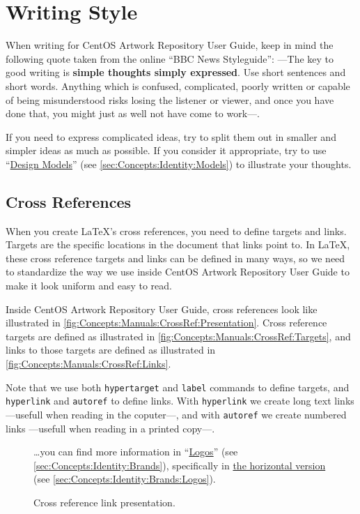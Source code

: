 \section{Writing Style}

When writing for CentOS Artwork Repository User Guide, keep in mind
the following quote taken from the online ``BBC News Styleguide'':
---The key to good writing is \textbf{simple thoughts simply
expressed}.  Use short sentences and short words.  Anything which is
confused, complicated, poorly written or capable of being
misunderstood risks losing the listener or viewer, and once you have
done that, you might just as well not have come to work---.

If you need to express complicated ideas, try to split them out in
smaller and simpler ideas as much as possible. If you consider it
appropriate, try to use
``\hyperlink{sec:Concepts:Identity:Models}{Design Models}'' (see
\autoref{sec:Concepts:Identity:Models}) to illustrate your thoughts.

\subsection{Cross References}

When you create \LaTeX's cross references, you need to define targets
and links.  Targets are the specific locations in the document that
links point to.  In \LaTeX, these cross reference targets and links
can be defined in many ways, so we need to standardize the way we use
inside CentOS Artwork Repository User Guide to make it look uniform
and easy to read.

Inside CentOS Artwork Repository User Guide, cross references look
like illustrated in
\autoref{fig:Concepts:Manuals:CrossRef:Presentation}.  Cross reference
targets are defined as illustrated in
\autoref{fig:Concepts:Manuals:CrossRef:Targets}, and links to those
targets are defined as illustrated in
\autoref{fig:Concepts:Manuals:CrossRef:Links}. 

Note that we use both \texttt{hypertarget} and \texttt{label} commands
to define targets, and \texttt{hyperlink} and \texttt{autoref} to
define links.  With \texttt{hyperlink} we create long text links
---usefull when reading in the coputer---, and with \texttt{autoref}
we create numbered links ---usefull when reading in a printed copy---.

\begin{figure}[!hbp]
\hrulefill
\begin{flushleft}
\dots you can find more information in
``\hyperlink{sec:Concepts:Identity:Brands}{Logos}'' (see
\autoref{sec:Concepts:Identity:Brands}), specifically in
\hyperlink{sec:Concepts:Identity:Brands:Logos}{the horizontal version} (see
\autoref{sec:Concepts:Identity:Brands:Logos}).
\end{flushleft}
\hrulefill
\caption{Cross reference link presentation.%
   \label{fig:Concepts:Manuals:CrossRef:Presentation}}
\end{figure}

